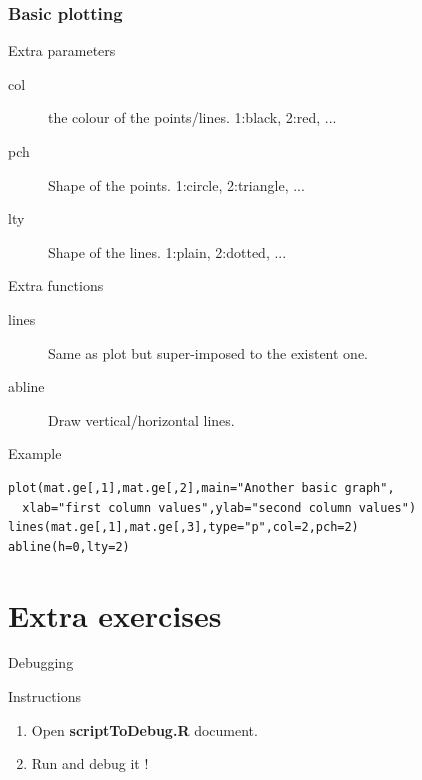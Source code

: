 \documentclass[10pt]{beamer}
\newenvironment{xframe}[2][]
  {\begin{frame}[fragile,environment=xframe,#1]
  \frametitle{#2}}
  {\end{frame}}
\begin{document}

\begin{xframe}{Basic plotting}
  \begin{block}{Extra parameters}
    \begin{description}
      \item[col] the colour of the points/lines. 1:black, 2:red, ...
      \item[pch] Shape of the points. 1:circle, 2:triangle, ...
      \item[lty] Shape of the lines. 1:plain, 2:dotted, ...
    \end{description}
  \end{block}
  \begin{block}{Extra functions}
    \begin{description}
      \item[lines] Same as plot but super-imposed to the existent one.
      \item[abline] Draw vertical/horizontal lines.  
    \end{description}
  \end{block}
  \begin{exampleblock}{Example}
\begin{verbatim}
plot(mat.ge[,1],mat.ge[,2],main="Another basic graph",
  xlab="first column values",ylab="second column values")
lines(mat.ge[,1],mat.ge[,3],type="p",col=2,pch=2)
abline(h=0,lty=2)
\end{verbatim}  
  \end{exampleblock}
\end{xframe}


\section{Extra exercises}

\begin{frame}{Debugging}
  \begin{block}{Instructions}
    \begin{enumerate}
    \item Open {\bf scriptToDebug.R} document.
    \item Run and debug it !
    \end{enumerate}
  \end{block}
\end{frame}
\end{document}

